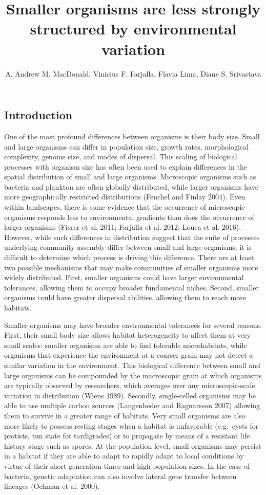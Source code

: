 \documentclass[12pt,]{article}
\title{Smaller organisms are less strongly structured by environmental
variation}
\author{A. Andrew M. MacDonald, Vinicius F. Farjalla, Flavia Lima, Diane S.
Srivastava}
\date{}
\begin{document}
\maketitle

\subsection{Introduction}\label{introduction}

One of the most profound differences between organisms is their body
size. Small and large organisms can differ in population size, growth
rates, morphological complexity, genome size, and modes of dispersal.
This scaling of biological processes with organism size has often been
used to explain differences in the spatial distribution of small and
large organisms. Microscopic organisms such as bacteria and plankton are
often globally distributed, while larger organisms have more
geographically restricted distributions (Fenchel and Finlay 2004). Even
within landscapes, there is some evidence that the occurrence of
microscopic organisms responds less to environmental gradients than does
the occurrence of larger organisms (Fierer et al. 2011; Farjalla et al.
2012; Louca et al. 2016). However, while such differences in
distribution suggest that the suite of processes underlying community
assembly differ between small and large organisms, it is difficult to
determine which process is driving this difference. There are at least
two possible mechanisms that may make communities of smaller organisms
more widely distributed. First, smaller organisms could have larger
environmental tolerances, allowing them to occupy broader fundamental
niches. Second, smaller organisms could have greater dispersal
abilities, allowing them to reach more habitats.

Smaller organisms may have broader environmental tolerances for several
reasons. First, their small body size allows habitat heterogeneity to
affect them at very small scales: smaller organisms are able to find
tolerable microhabitats, while organisms that experience the environment
at a coarser grain may not detect a similar variation in the
environment. This biological difference between small and large
organisms can be compounded by the macroscopic grain at which organisms
are typically observed by researchers, which averages over any
microscopic-scale variation in distribution (Wiens 1989). Secondly,
single-celled organisms may be able to use multiple carbon sources
(Langenheder and Ragnarsson 2007) allowing them to survive in a greater
range of habitats. Very small organisms are also more likely to possess
resting stages when a habitat is unfavorable (e.g.~cysts for protists,
tun state for tardigrades) or to propagate by means of a resistant life
history stage such as spores. At the population level, small organisms
may persist in a habitat if they are able to adapt to rapidly adapt to
local conditions by virtue of their short generation times and high
population sizes. In the case of bacteria, genetic adaptation can also
involve lateral gene transfer between lineages (Ochman et al. 2000).
\end{document}
